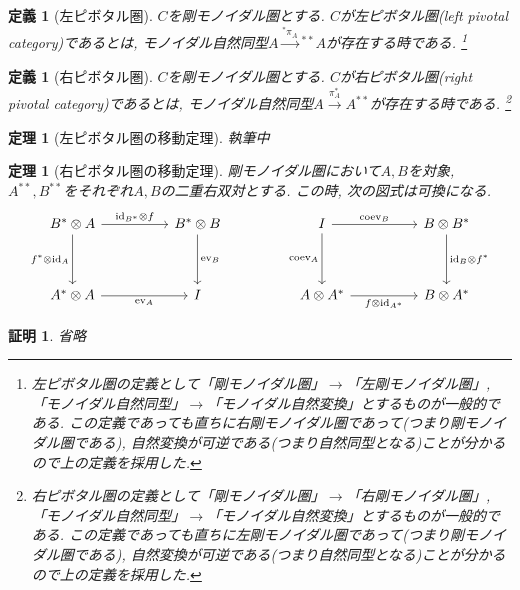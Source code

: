 \documentclass[a4paper,12pt]{ltjsarticle}
\theoremstyle{break}
\newtheorem{defn}[thm]{定義}
\newtheorem{thrm}[thm]{定理}
\newtheorem*{prf}{証明}
\newcommand{\xr}[1]{\xrightarrow{#1}}
\newcommand{\id}{\mathrm{id}}
\newcommand{\eva}{\mathrm{ev}}
\newcommand{\coev}{\mathrm{coev}}
\newcommand{\ot}{\otimes}
\numberwithin{equation}{section}
\begin{document}
\begin{defn}[左ピボタル圏]
  $C$を剛モノイダル圏とする. 
  $C$が左ピボタル圏(left pivotal category)であるとは, モノイダル自然同型$A \xr{{}^*\pi_A} {}^{**}A$が存在する時である.
  \footnote{
      左ピボタル圏の定義として「剛モノイダル圏」$\to$「左剛モノイダル圏」, 「モノイダル自然同型」$\to$「モノイダル自然変換」とするものが一般的である. 
      この定義であっても直ちに右剛モノイダル圏であって(つまり剛モノイダル圏である), 自然変換が可逆である(つまり自然同型となる)ことが分かるので上の定義を採用した. 
    }
\end{defn}

\begin{defn}[右ピボタル圏]
  $C$を剛モノイダル圏とする. 
  $C$が右ピボタル圏(right pivotal category)であるとは, モノイダル自然同型$A \xr{\pi^*_A} A^{**}$が存在する時である.
  \footnote{
      右ピボタル圏の定義として「剛モノイダル圏」$\to$「右剛モノイダル圏」, 「モノイダル自然同型」$\to$「モノイダル自然変換」とするものが一般的である. 
      この定義であっても直ちに左剛モノイダル圏であって(つまり剛モノイダル圏である), 自然変換が可逆である(つまり自然同型となる)ことが分かるので上の定義を採用した. 
    }
\end{defn}

\begin{thrm}[左ピボタル圏の移動定理]
  執筆中
\end{thrm}

\begin{thrm}[右ピボタル圏の移動定理]
  剛モノイダル圏において$A,B$を対象, $A^{**},B^{**}$をそれぞれ$A,B$の二重右双対とする. 
  この時, 次の図式は可換になる. 
  \[\begin{tikzcd}
    {B^* \ot A} && {B^* \ot B} && I && {B \ot B^*} \\
    \\
    {A^* \ot A} && I && {A \ot A^*} && {B \ot A^*}
    \arrow["{\id_{B^*} \ot f}", from=1-1, to=1-3]
    \arrow["{f^* \ot \id_A}"', from=1-1, to=3-1]
    \arrow["{\eva_A}"', from=3-1, to=3-3]
    \arrow["{\eva_B}", from=1-3, to=3-3]
    \arrow["{\coev_B}", from=1-5, to=1-7]
    \arrow["{\coev_A}"', from=1-5, to=3-5]
    \arrow["{f \ot \id_{A^*}}"', from=3-5, to=3-7]
    \arrow["{\id_B \ot f^*}", from=1-7, to=3-7]
  \end{tikzcd}\]
\end{thrm}

\begin{prf}
  省略
\end{prf}
\end{document}
